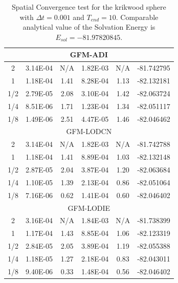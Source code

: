 \begin{table}[!t]
\begin{tabular}{c c c c c c }
\multicolumn{6}{c}{GFM-ADI} \\ \hline
  2 & 3.14E-04 & N/A & 1.82E-03 & N/A & -81.742795 \\ %
  1 & 1.18E-04 & 1.41 & 8.28E-04 & 1.13 & -82.132181 \\%
1/2 & 2.79E-05 & 2.08 & 3.10E-04 & 1.42 & -82.063724 \\ %
1/4 & 8.51E-06 & 1.71 & 1.23E-04 & 1.34 & -82.051117 \\ %
1/8 & 1.49E-06 & 2.51 & 4.47E-05 & 1.46 & -82.046462 \\ \hline
\multicolumn{6}{c}{GFM-LODCN} \\ \hline
  2 & 3.14E-04 & N/A  & 1.82E-03 & N/A  & -81.742788 \\ %
  1 & 1.18E-04 & 1.41 & 8.89E-04 & 1.03 & -82.132148 \\ %
1/2 & 2.87E-05 & 2.04 & 3.87E-04 & 1.20 & -82.063684 \\ %
1/4 & 1.10E-05 & 1.39 & 2.13E-04 & 0.86 & -82.051064 \\ %
1/8 & 7.16E-06 & 0.62 & 1.41E-04 & 0.60 & -82.046402 \\ \hline
\multicolumn{6}{c}{GFM-LODIE} \\ \hline
2   & 3.16E-04 & N/A   & 1.84E-03 & N/A   & -81.738399 \\ %
1   & 1.17E-04 & 1.43  & 8.85E-04 & 1.06  & -82.123319 \\ %
1/2 & 2.84E-05 & 2.05  & 3.89E-04 & 1.19  & -82.055388 \\ %
1/4 & 1.18E-05 & 1.27  & 2.18E-04 & 0.83  & -82.043011 \\ %
1/8 & 9.40E-06 & 0.33  & 1.48E-04 & 0.56  & -82.046402 \\ \hline
\end{tabular}
\caption{Spatial Convergence test for the krikwood sphere with $\Delta t = 0.001$ and $T_{end}=10$. Comparable analytical value of the Solvation Energy is $E_{sol} = -81.97820845$.}
\label{tab:krikwood}
\end{table}


